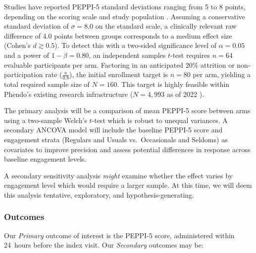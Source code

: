 Studies have reported PEPPI-5 standard deviations ranging from 5 to 8 points, depending on the scoring scale and study population \cite{raymond2011selfefficacy,tenKlooster2012PEPPI}. Assuming a conservative standard deviation of $\sigma = 8.0$ on the standard scale, a clinically relevant raw difference of 4.0 points between groups corresponds to a medium effect size (Cohen's $d \gtrsim 0.5$). To detect this with a two-sided significance level of $\alpha = 0.05$ and a power of $1 - \beta = 0.80$, an independent samples $t$-test requires $n = 64$ evaluable participants per arm. Factoring in an anticipated 20\% attrition or non-participation rate ($\frac{n}{0.8}$), the initial enrollment target is $n = 80$ per arm, yielding a total required sample size of $N = 160$. This target is highly feasible within Phendo's existing research infrastructure ($N = 4{,}993$ as of 2022 \cite{Urteaga2022Engagement}).

The primary analysis will be a comparison of mean PEPPI-5 score between arms using a two-sample Welch's $t$-test\cite{Welch1947Generalization} which is robust to unequal variances. A secondary ANCOVA model will include the baseline PEPPI-5 score and engagement strata (Regulars and Usuals vs.\ Occasionals and Seldoms) as covariates to improve precision and assess potential differences in response across baseline engagement levels.

A secondary sensitivity analysis \textit{might} examine whether the effect varies by engagement level which would require a larger sample. At this time, we will deem this analysis tentative, exploratory, and hypothesis-generating.

\subsubsection{Outcomes}

Our \textit{Primary} outcome of interest is the PEPPI-5 score, administered within 24~hours before the index visit. Our \textit{Secondary} outcomes may be:

